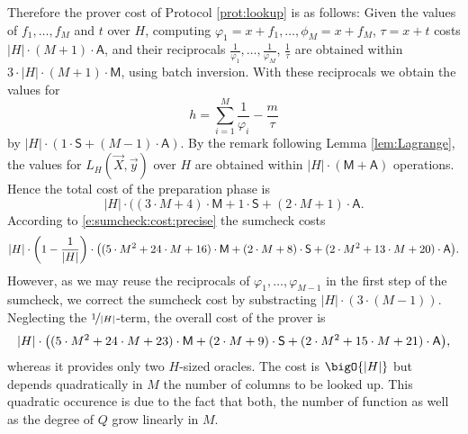 \documentclass[11pt]{article}
\theoremstyle{definition}
\theoremstyle{definition}
\begin{document}
Therefore the prover cost of Protocol \ref{prot:lookup} is as follows:
Given the values of $f_1, \ldots, f_M$ and $t$ over $H$, computing $\varphi_1 = x + f_1, \ldots, \phi_M = x + f_M$,  $\tau = x + t$ costs $|H|\cdot (M+ 1) \cdot\mathsf A$, and their reciprocals $\frac{1}{\varphi_1},  \ldots, \frac{1}{\varphi_M}$, $\frac{1}{\tau}$ are obtained within $3\cdot |H| \cdot (M+1) \cdot\mathsf M$, using batch inversion. 
With these reciprocals we obtain the values for
\[
h = \sum_{i=1}^M \frac{1}{\varphi_i} - \frac{m}{\tau} 
\]
by $|H|\cdot (1\cdot \mathsf S +(M-1)\cdot\mathsf A)$. 
By the remark following Lemma \ref{lem:Lagrange}, the values for $L_H(\vec X, \vec y)$ over $H$ are obtained within $|H|\cdot (\mathsf M + \mathsf A)$ operations. 
Hence the total cost of the preparation phase is
\[
|H|\cdot ((3\cdot M + 4)\cdot\mathsf M + 1\cdot\mathsf S + (2\cdot M + 1) \cdot\mathsf A.
\]
According to \eqref{e:sumcheck:cost:precise} the sumcheck costs  
\begin{equation*}
|H| \cdot \left(1-\frac{1}{|H|}\right)\cdot \big((5\cdot M^2 + 24 \cdot M + 16) \cdot\textsf M + (2\cdot M + 8)\cdot\textsf S + (2\cdot M^2 + 13\cdot M + 20) \cdot \textsf A\big).
\end{equation*}
However, as we may reuse the reciprocals of $\varphi_1,  \ldots, \varphi_{M-1}$ in the first step of the sumcheck, we correct the sumcheck cost by substracting $|H|\cdot (3\cdot (M-1))$. 
Neglecting the $\nicefrac{1}{|H|}$-term, the overall cost of the prover is 
\begin{equation}
\label{e:lookup:cost}
|H| \cdot  \big((5\cdot M^2 + 24 \cdot M + 23) \cdot\textsf M 
+ (2\cdot M + 9)\cdot\textsf S 
+ (2\cdot M^2 + 15\cdot M + 21) \cdot \textsf A\big),
\end{equation}
whereas it provides only two $H$-sized oracles. 
The cost is $\bigO{|H|}$ but depends quadratically in $M$ the number of columns to be looked up. 
This quadratic occurence is due to the fact that both, the number of function as well as the degree of $Q$ grow linearly in $M$. 
\end{document}
